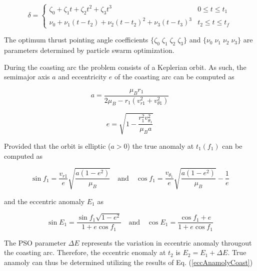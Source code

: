 \begin{equation}
    \delta = 
    \begin{cases}
        \zeta_0 +\zeta_1t+\zeta_2t^2 +\zeta_3t^3 & 0 \leq t \leq t_1 \\
        \nu_0 + \nu_1(t-t_2) + \nu_2(t-t_2)^2+\nu_3(t-t_3)^3 & t_2 \leq t \leq t_f
    \end{cases}
    \label{delta_eq}
\end{equation} \linebreak

\noindent The optimum thrust pointing angle coefficients $\{\zeta_0 \; \zeta_1 \; \zeta_2 \; \zeta_3 \}$
and $\{\nu_0 \; \nu_1 \; \nu_2 \; \nu_3\}$ are parameters determined by particle swarm optimization. \newline

\noindent During the coasting arc the problem consists of a Keplerian orbit. As such, the semimajor axis $a$ and eccentricity $e$ of the coasting arc can be computed as

\begin{equation}
a = \dfrac{\mu_Br_1}{2\mu_B - r_1(v_{r1}^2+v_{\theta1}^2)}
\label{acoast}
\end{equation}

\begin{equation}
e = \sqrt{1-\dfrac{r_1^2v_{\theta_1}^2}{\mu_Ba}}
\label{ecoast}
\end{equation} \newline

\noindent Provided that the orbit is elliptic ($a > 0$) the true anomaly at $t_1(f_1)$ can be computed as

\begin{equation}
\sin f_1 = \dfrac{v_{r1}}{e}\sqrt{\dfrac{a(1-e^2)}{\mu_B}} \quad \text{and} \quad \cos{f_1} = \dfrac{v_{\theta_1}}{e}\sqrt{\dfrac{a(1-e^2)}{\mu_B}}-\dfrac{1}{e}
\label{trueAnamolyCoast}
\end{equation} \newline

\noindent and the eccentric anomaly $E_1$ as 

\begin{equation}
\sin{E_1} = \dfrac{\sin{f_1}\sqrt{1-e^2}}{1+e\cos{f_1}} \quad \text{and} \quad 
\cos{E_1} = \dfrac{\cos{f_1}+e}{1+e\cos{f_1}}
\label{eccAnamolyCoast}
\end{equation}

\noindent The PSO parameter $\Delta E$ represents the variation in eccentric anomaly througout the coasting arc. Therefore, the eccentric enomaly at $t_2$ is $E_2 = E_1 + \Delta E$. True anamoly can
thus be determined utilizing the results of Eq. (\ref{eccAnamolyCoast})

